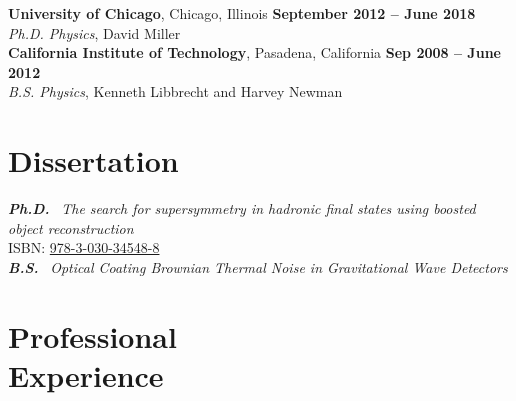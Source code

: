 \documentclass[margin,line]{resume}
\let\origsection\section%
\let\section\subsection%
\let\section\origsection%
\begin{document}
\begin{resume}
\textbf{University of Chicago}, Chicago, Illinois \hfill \textbf{September 2012 -- June 2018}\\
\textsl{Ph.D. Physics}, David Miller\\[2.5mm]
%
\textbf{California Institute of Technology}, Pasadena, California \hfill \textbf{ Sep 2008 -- June 2012}\\
\textsl{B.S. Physics}, Kenneth Libbrecht and Harvey Newman
%
%

\section{\mysidestyle Dissertation}

\textbf{\textsl{Ph.D.}} \href{https://kratsg.github.io/thesis/?utm_source=cv}{}~\textsl{The search for supersymmetry in hadronic final states using boosted object reconstruction}\\
ISBN: \href{https://books.google.com/books?vid=ISBN978-3-030-34548-8}{978-3-030-34548-8}\\[2.5mm]
\textbf{\textsl{B.S.}}\hspace{3mm} \href{https://www.dropbox.com/s/h0mpop96cn563bq/Thesis.pdf?dl=0}{}~\textsl{Optical Coating Brownian Thermal Noise in Gravitational Wave Detectors}

\section{\mysidestyle Professional\\Experience}


\end{resume}
\end{document}
